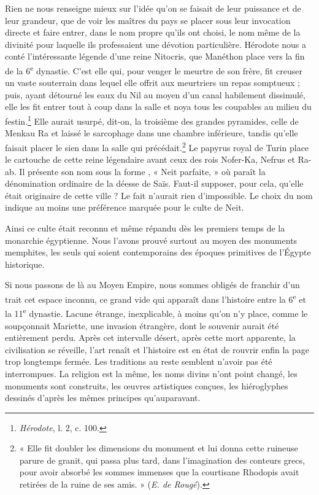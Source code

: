 \documentclass[a4paper, 11pt, oneside]{article}
\newcommand*\hieroAAUU{}
\begin{document}
Rien ne nous renseigne mieux sur l'idée qu'on se faisait de leur puissance et de leur grandeur, que de voir les maîtres du pays se placer sous leur invocation directe et faire entrer, dans le nom propre qu'ils ont choisi, le nom même de la divinité pour laquelle ils professaient une dévotion particulière. Hérodote nous a conté l'intéressante légende d'une reine Nitocris, que Manéthon place vers la fin de la 6\textsuperscript{e} dynastie. C'est elle qui, pour venger le meurtre de son frère, fit creuser un vaste souterrain dans lequel elle offrit aux meurtriers un repas somptueux ; puis, ayant détourné les eaux du Nil au moyen d'un canal habilement dissimulé, elle les fit entrer tout à coup dans la salle et noya tous les coupables au milieu du festin.\footnote{\emph{Hérodote}, l. 2, c. 100.} Elle aurait usurpé, dit-on, la troisième des grandes pyramides, celle de Menkau Ra et laissé le sarcophage dans une chambre inférieure, tandis qu’elle faisait placer le sien dans la salle qui précédait.\footnote{« Elle fit doubler les dimensions du monument et lui donna cette ruineuse parure de granit, qui passa plus tard, dans l'imagination des conteurs grecs, pour avoir absorbé les sommes immenses que la courtisane Rhodopis avait retirées de la ruine de ses amis. » (\emph{E. de Rougé}).} Le papyrus royal de Turin place le cartouche de cette reine légendaire avant ceux des rois Nofer-Ka, Nefrus et Ra-ab. Il présente son nom sous la forme $\hieroAAUU$, « Neit parfaite, » où paraît la dénomination ordinaire de la déesse de Saïs. Faut-il supposer, pour cela, qu'elle était originaire de cette ville ? Le fait n'aurait rien d'impossible. Le choix du nom indique au moins une préférence marquée pour le culte de Neit.

Ainsi ce culte était reconnu et même répandu dès les premiers temps de la monarchie égyptienne. Nous l'avons prouvé surtout au moyen des monuments memphites, les seuls qui soient contemporains des époques primitives de l'Égypte historique.

Si nous passons de là au Moyen Empire, nous sommes obligés de franchir d'un trait cet espace inconnu, ce grand vide qui apparaît dans l'histoire entre la 6\textsuperscript{e} et la 11\textsuperscript{e} dynastie. Lacune étrange, inexplicable, à moins qu'on n'y place, comme le soupçonnait Mariette, une invasion étrangère, dont le souvenir aurait été entièrement perdu. Après cet intervalle désert, après cette mort apparente, la civilisation se réveille, l'art renaît et l'histoire est en état de rouvrir enfin la page trop longtemps fermée. Les traditions au reste semblent n'avoir pas été interrompues. La religion est la même, les noms divins n'ont point changé, les monuments sont construits, les œuvres artistiques conçues, les hiéroglyphes dessinés d'après les mêmes principes qu'auparavant.
\end{document}
